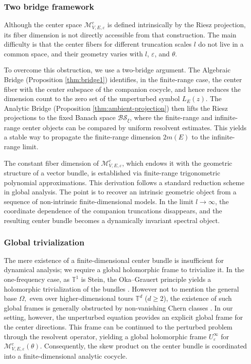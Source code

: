 \documentclass[reqno,11pt]{amsart}
\begin{document}
\subsubsection{Two bridge framework }



Although the center space $\mathcal M^c_{V,E,\varepsilon}$ is defined intrinsically by the Riesz projection, its fiber dimension is not directly accessible from that construction. The main difficulty is that the center fibers for different truncation scales $l$ do not live in a common space, and their geometry varies with $l$, $\varepsilon$, and $\theta$. 

To overcome this obstruction, we use a two-bridge argument. The Algebraic Bridge (Proposition \ref{thm:bridge1}) identifies, in the finite-range case, the center fiber with the center subspace of the companion cocycle, and hence reduces the dimension count to the zero set of the unperturbed symbol $L_E(z)$. The Analytic Bridge (Proposition \ref{thm:ambient-projection}) then lifts the Riesz projections to the fixed Banach space $\mathcal{BS}_\xi$, where the finite-range and infinite-range center objects can be compared by uniform resolvent estimates. This yields a stable way to propagate the finite-range dimension $2m(E)$ to the infinite-range limit.

The constant fiber dimension of $\boldsymbol{\mathcal M}^c_{V,E,\varepsilon}$, which  endows it with the geometric structure of a vector bundle, is established via finite-range trigonometric polynomial approximations. This derivation follows a standard reduction scheme in global analysis. The point is to recover an intrinsic geometric object from a sequence of non-intrinsic finite-dimensional models. In the limit $l\to\infty$, the coordinate dependence of the companion truncations disappears, and the resulting center bundle becomes a dynamically invariant spectral object.



\subsubsection{Global trivialization}
The mere existence of a finite-dimensional center bundle is insufficient for dynamical analysis; we require a global holomorphic frame to trivialize it.  In the one-frequency case, as $\mathbb T^1$ is Stein, the Oka--Grauert principle \cite{Forstneric2017} yields a holomorphic trivialization of the  bundles \cite{GJ,LXZ}. However not to mention the general base $\Omega,$ even over higher-dimensional tours $\mathbb{T}^d$ ($d \ge 2$), the existence of such global frames is generally obstructed by non-vanishing Chern classes \cite{DH}. In our setting, however, the unperturbed equation provides an explicit global frame for the center directions. This frame can be continued to
the perturbed problem through the resolvent operator, yielding a global holomorphic frame $U^\infty_\varepsilon$ for
$\mathcal M^c_{V,E,\varepsilon}(\theta)$.
Consequently, the skew product on the center bundle is coordinated into a finite-dimensional analytic cocycle.
\end{document}
